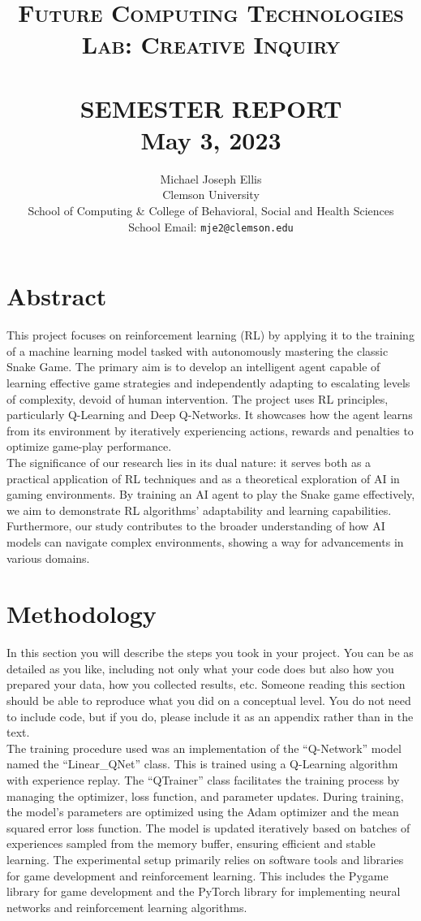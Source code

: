 \documentclass[paper=a4, fontsize=11pt,twoside]{scrartcl}
\title{
    \normalsize \textsc{Future Computing Technologies Lab: Creative Inquiry} \\ [2.0cm]
	\HRule{0.5pt} \\
	\LARGE \textbf{\uppercase{Semester Report}}
	\HRule{2pt} \\ [0.5cm]
	\normalsize May 3, 2023
}
\author{
	Michael Joseph Ellis\\	
	Clemson University\\	
	School of Computing \& College of Behavioral, Social and Health Sciences\\
	School Email: \texttt{mje2@clemson.edu} \\
}
\makeatletter
\def\printtitle{
	{\centering \@title\par}}
\def\printauthor{
	{\centering \large \@author}}
\makeatother
\begin{document}
\thispagestyle{empty}

\printtitle
\vfill
\printauthor
\newpage

\setcounter{page}{1}

\section{Abstract}

This project focuses on reinforcement learning (RL) by applying it to the training of a machine learning model tasked with autonomously mastering the classic Snake Game. The primary aim is to develop an intelligent agent capable of learning effective game strategies and independently adapting to escalating levels of complexity, devoid of human intervention. The project uses RL principles, particularly Q-Learning and Deep Q-Networks. It showcases how the agent learns from its environment by iteratively experiencing actions, rewards and penalties to optimize game-play performance.\\

The significance of our research lies in its dual nature: it serves both as a practical application of RL techniques and as a theoretical exploration of AI in gaming environments. By training an AI agent to play the Snake game effectively, we aim to demonstrate RL algorithms' adaptability and learning capabilities. Furthermore, our study contributes to the broader understanding of how AI models can navigate complex environments, showing a way for advancements in various domains.

\section{Methodology}

In this section you will describe the steps you took in your project. You can be as detailed as you like, including not only what your code does but also how you prepared your data, how you collected results, etc. Someone reading this section should be able to reproduce what you did on a conceptual level. You do not need to include code, but if you do, please include it as an appendix rather than in the text.\\

The training procedure used was an implementation of the “Q-Network” model named the “Linear\_QNet” class. This is trained using a Q-Learning algorithm with experience replay. The “QTrainer” class facilitates the training process by managing the optimizer, loss function, and parameter updates. During training, the model’s parameters are optimized using the Adam optimizer and the mean squared error loss function. The model is updated iteratively based on batches of experiences sampled from the memory buffer, ensuring efficient and stable learning. The experimental setup primarily relies on software tools and libraries for game development and reinforcement learning. This includes the Pygame library for game development and the PyTorch library for implementing neural networks and reinforcement learning algorithms.\\
\end{document}
